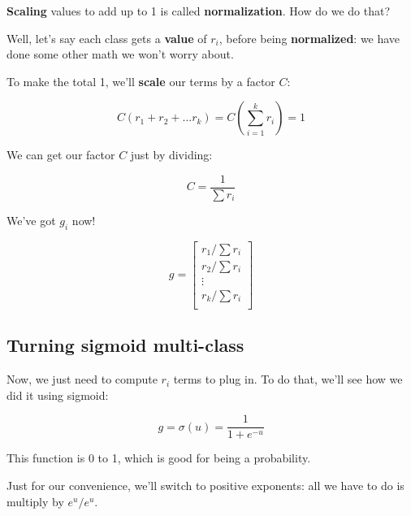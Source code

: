         \textbf{Scaling} values to add up to 1 is called \textbf{normalization}. How do we do that?
        
        Well, let's say each class gets a \textbf{value} of $r_i$, before being \textbf{normalized}: we have done some other math we won't worry about.
        
        To make the total 1, we'll \textbf{scale} our terms by a factor $C$:
        
        \begin{equation}
            C(r_1+r_2+...r_k) 
            = 
            C \left(\sum_{i=1}^k r_i \right)
            =
            1  
        \end{equation}
        
        We can get our factor $C$ just by dividing:
        
        \begin{equation}
            C 
            =
            \frac{1}{\sum r_i}
        \end{equation}
        
        We've got $g_i$ now!
        
        \begin{equation}
            g = 
            \begin{bmatrix}
                r_1/\sum r_i  \\
                r_2/\sum r_i  \\
                \vdots  \\
                r_k/\sum r_i  \\
            \end{bmatrix}
        \end{equation}
        
    \subsection*{Turning sigmoid multi-class}
    
        Now, we just need to compute $r_i$ terms to plug in. To do that, we'll see how we did it using sigmoid:
        
        \begin{equation}
            g= \sigma(u) = \frac{1}{1+e^{-u}}
        \end{equation}
        
        This function is 0 to 1, which is good for being a probability. 
        
        Just for our convenience, we'll switch to positive exponents: all we have to do is multiply by $e^u/e^u$.
        
